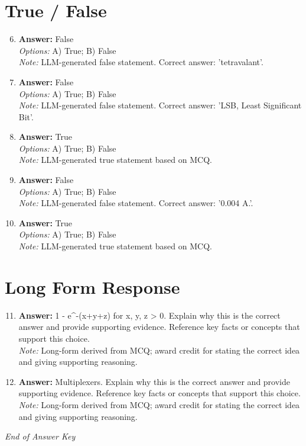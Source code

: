 \documentclass[12pt]{article}
\begin{document}
\section*{True / False}
\begin{enumerate}[label=\arabic*.]
\setcounter{enumi}{5}
\item \textbf{Answer:} False
\\ \textit{Options:} A) True; B) False
\\ \textit{Note:} LLM-generated false statement. Correct answer: 'tetravalant'.
\item \textbf{Answer:} False
\\ \textit{Options:} A) True; B) False
\\ \textit{Note:} LLM-generated false statement. Correct answer: 'LSB, Least Significant Bit'.
\item \textbf{Answer:} True
\\ \textit{Options:} A) True; B) False
\\ \textit{Note:} LLM-generated true statement based on MCQ.
\item \textbf{Answer:} False
\\ \textit{Options:} A) True; B) False
\\ \textit{Note:} LLM-generated false statement. Correct answer: '0.004 A.'.
\item \textbf{Answer:} True
\\ \textit{Options:} A) True; B) False
\\ \textit{Note:} LLM-generated true statement based on MCQ.
\end{enumerate}

\section*{Long Form Response}
\begin{enumerate}[label=\arabic*.]
\setcounter{enumi}{10}
\item \textbf{Answer:} 1 - e^-(x+y+z) for x, y, z \textgreater{} 0. Explain why this is the correct answer and provide supporting evidence. Reference key facts or concepts that support this choice.
\\ \textit{Note:} Long-form derived from MCQ; award credit for stating the correct idea and giving supporting reasoning.
\item \textbf{Answer:} Multiplexers. Explain why this is the correct answer and provide supporting evidence. Reference key facts or concepts that support this choice.
\\ \textit{Note:} Long-form derived from MCQ; award credit for stating the correct idea and giving supporting reasoning.
\end{enumerate}

\vfill
\noindent\textit{End of Answer Key}
\end{document}
